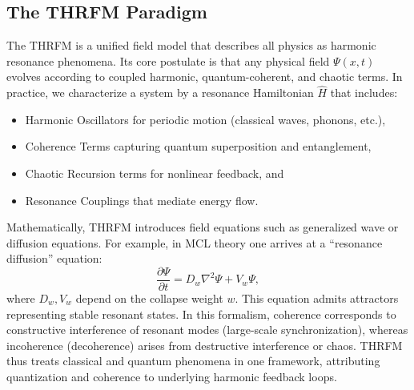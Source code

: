 \documentclass[11pt,a4paper]{article}
\begin{document}
\subsection{The THRFM Paradigm}
\label{subsec:thrfm_paradigm}
The THRFM is a unified field model that describes all physics as harmonic resonance phenomena. Its core postulate is that any physical field 
$\Psi(x,t)$ evolves according to coupled harmonic, quantum-coherent, and chaotic terms. In practice, we characterize a system by a resonance Hamiltonian 
$\hat{H}$ that includes:
\begin{itemize}
\item Harmonic Oscillators for periodic motion (classical waves, phonons, etc.),
\item Coherence Terms capturing quantum superposition and entanglement,
\item Chaotic Recursion terms for nonlinear feedback, and
\item Resonance Couplings that mediate energy flow.
\end{itemize}
Mathematically, THRFM introduces field equations such as generalized wave or diffusion equations. For example, in MCL theory one arrives at a “resonance diffusion” equation:
\begin{equation}
\frac{\partial \Psi}{\partial t} = D_w \nabla^2 \Psi + V_w \Psi,
\end{equation}
where 
$D_w, V_w$ depend on the collapse weight 
$w$. This equation admits attractors representing stable resonant states. In this formalism, coherence corresponds to constructive interference of resonant modes (large-scale synchronization), whereas incoherence (decoherence) arises from destructive interference or chaos. THRFM thus treats classical and quantum phenomena in one framework, attributing quantization and coherence to underlying harmonic feedback loops.
\end{document}
